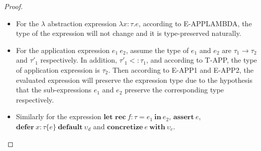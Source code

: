 \begin{proof}
\begin{itemize}
            \item For the $\lambda$ abstraction expression $\lambda x:\tau.e$, according to E-APPLAMBDA, the type of the expression will not change and it is type-preserved naturally.
            \item For the application expression $e_1~e_2$, assume the type of $e_1$ and $e_2$ are $\tau_1\rightarrow\tau_2$ and $\tau'_1$ respectively. In addition, $\tau'_1<:\tau_1$, and according to T-APP, the type of application expression is $\tau_2$. Then according to E-APP1 and E-APP2, the evaluated expression will preserve the expression type due to the hypothesis that the sub-expressions $e_1$ and $e_2$ preserve the corresponding type respectively.
            \item Similarly for the expression $\textbf{let rec}~f:\tau=e_1~\textbf{in}~e_2$, $\textbf{assert}~e$, $\textbf{defer}~x:\tau\{e\}~\textbf{default}~\upsilon_d$ and $\textbf{concretize}~e~\textbf{with}~\upsilon_c$.
        \end{itemize}
        
    \end{proof}